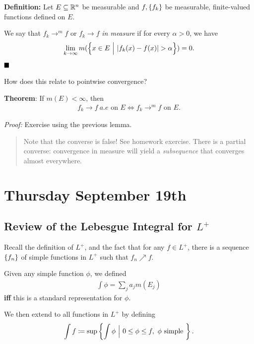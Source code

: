 \textbf{Definition:} Let \(E \subseteq {\mathbb{R}}^n\) be measurable and
\(f, \left\{{f_k}\right\}\) be measurable, finite-valued functions defined on
\(E\).

We say that \(f_k \to^m f\) or \(f_k \to f\) \emph{in measure} if for
every \(\alpha > 0\), we have
\begin{align*}
\lim_{k\to\infty} m(\left\{{x \in E {~\mathrel{\Big|}~} {\left\lvert {f_k(x) - f(x)} \right\rvert} > \alpha}\right\}) = 0
.\end{align*} \(\qed\)

How does this relate to pointwise convergence?

\textbf{Theorem}: If \(m(E) < \infty\), then
\begin{align*}
f_k \to f ~a.e \text{ on } E \iff f_k \to^m f \text{ on } E
.\end{align*}

\emph{Proof:} Exercise using the previous lemma.

\begin{quote}
Note that the converse is false! See homework exercise. There is a
partial converse: convergence in measure will yield a \emph{subsequence}
that converges almost everywhere.
\end{quote}

\hypertarget{thursday-september-19th}{%
\section{Thursday September 19th}\label{thursday-september-19th}}

\hypertarget{review-of-the-lebesgue-integral-for-l}{%
\subsection{\texorpdfstring{Review of the Lebesgue Integral for
\(L^+\)}{Review of the Lebesgue Integral for L\^{}+}}\label{review-of-the-lebesgue-integral-for-l}}

Recall the definition of \(L^+\), and the fact that for any
\(f\in L^+\), there is a sequence \(\left\{{f_n}\right\}\) of simple functions
in \(L^+\) such that \(f_n \nearrow f\).

Given any simple function \(\phi\), we defined
\begin{align*}
\int \phi = \sum_j a_j m(E_j)
\end{align*} \textbf{iff} this is a standard representation for
\(\phi\).

We then extend to all functions in \(L^+\) by defining
\begin{align*}
\int f \coloneqq \sup \left\{{\int \phi {~\mathrel{\Big|}~} 0\leq \phi \leq f,~\phi\text{ simple }}\right\}
.\end{align*}

